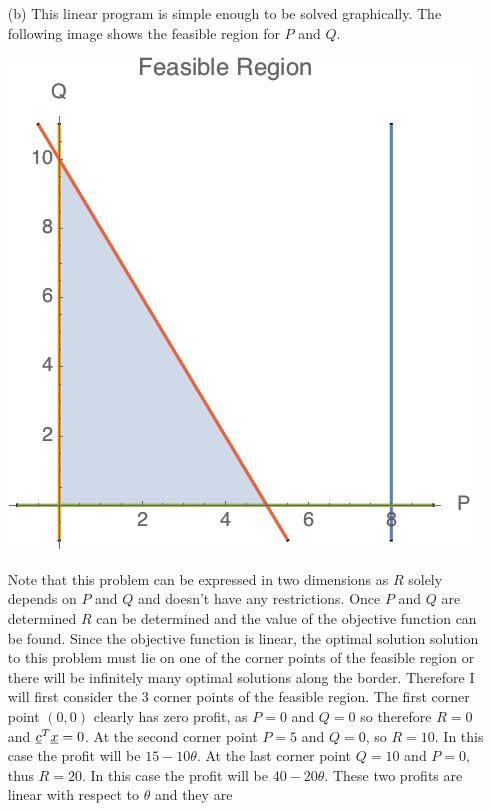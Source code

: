 \documentclass[11pt, oneside]{article}
\begin{document}
\begin{enumerate}
\begin{enumerate}
      \item[(b)] %
        This linear program is simple enough to be solved graphically.
        The following image shows the feasible region for $P$ and $Q$.
        \begin{center}
          \includegraphics[scale=.7]{Figures/final_1}
        \end{center}
        Note that this problem can be expressed in two dimensions as $R$
        solely depends on $P$ and $Q$ and doesn't have any restrictions.
        Once $P$ and $Q$ are determined $R$ can be determined and the value of
        the objective function can be found.
        Since the objective function is linear, the optimal solution solution
        to this problem must lie on one of the corner points of the feasible
        region or there will be infinitely many optimal solutions along the
        border.
        Therefore I will first consider the 3 corner points of the feasible
        region.
        The first corner point $(0, 0)$ clearly has zero profit, as $P = 0$
        and $Q = 0$ so therefore $R = 0$ and $\underline{c}^T \underline{x} = 0$.
        At the second corner point $P = 5$ and $Q = 0$, so $R = 10$.
        In this case the profit will be $15 - 10\theta$.
        At the last corner point $Q = 10$ and $P = 0$, thus $R = 20$.
        In this case the profit will be $40 - 20\theta$.
        These two profits are linear with respect to $\theta$ and they are

\end{enumerate}
\end{enumerate}
\end{document}
